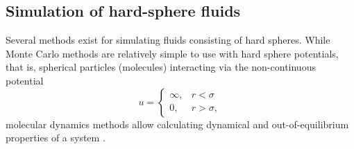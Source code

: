 
\subsection{Simulation of hard-sphere fluids}
Several methods exist for simulating fluids consisting of hard spheres.
While Monte Carlo methods are relatively simple to use with hard sphere potentials, 
that is, spherical particles (molecules) interacting via the non-continuous potential 
\begin{equation}
    u = 
    \begin{cases}
        \infty, & r < \sigma \\
        0, & r > \sigma,
    \end{cases}
\end{equation}
molecular dynamics methods allow calculating dynamical and out-of-equilibrium properties of a system \cite{ref:allen:MD_sim}.

